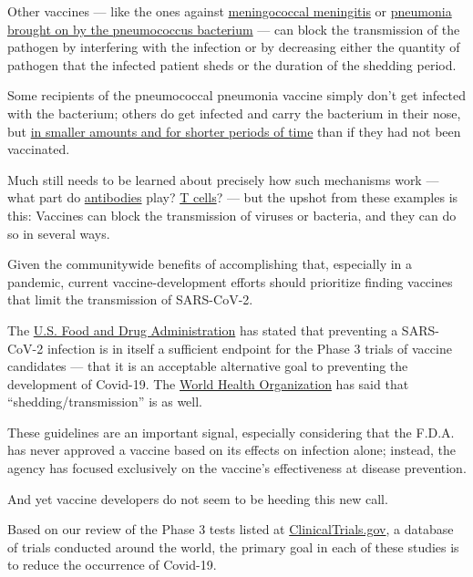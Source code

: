 Other vaccines --- like the ones against
\href{https://academic.oup.com/cid/advance-article-abstract/doi/10.1093/cid/ciaa610/5843568?redirectedFrom=fulltext}{meningococcal
meningitis} or
\href{https://www.ncbi.nlm.nih.gov/pmc/articles/PMC6611220/pdf/main.pdf}{pneumonia
brought on by the pneumococcus bacterium} --- can block the transmission
of the pathogen by interfering with the infection or by decreasing
either the quantity of pathogen that the infected patient sheds or the
duration of the shedding period.

Some recipients of the pneumococcal pneumonia vaccine simply don't get
infected with the bacterium; others do get infected and carry the
bacterium in their nose, but
\href{https://www.atsjournals.org/doi/full/10.1164/rccm.201503-0542OC}{in
smaller amounts and for shorter periods of time} than if they had not
been vaccinated.

Much still needs to be learned about precisely how such mechanisms work
--- what part do
\href{https://www.britannica.com/science/antibody}{antibodies} play?
\href{https://www.britannica.com/science/T-cell}{T cells}? --- but the
upshot from these examples is this: Vaccines can block the transmission
of viruses or bacteria, and they can do so in several ways.

Given the communitywide benefits of accomplishing that, especially in a
pandemic, current vaccine-development efforts should prioritize finding
vaccines that limit the transmission of SARS-CoV-2.

The \href{https://www.fda.gov/media/139638/download}{U.S. Food and Drug
Administration} has stated that preventing a SARS-CoV-2 infection is in
itself a sufficient endpoint for the Phase 3 trials of vaccine
candidates --- that it is an acceptable alternative goal to preventing
the development of Covid-19. The
\href{https://www.who.int/docs/default-source/blue-print/who-target-product-profiles-for-covid-19-vaccines.pdf?sfvrsn=1d5da7ca_5\&download=true}{World
Health Organization} has said that ``shedding/transmission'' is as well.

These guidelines are an important signal, especially considering that
the F.D.A. has never approved a vaccine based on its effects on
infection alone; instead, the agency has focused exclusively on the
vaccine's effectiveness at disease prevention.

And yet vaccine developers do not seem to be heeding this new call.

Based on our review of the Phase 3 tests listed at
\href{https://clinicaltrials.gov/ct2/results?term=vaccine\%2C+phase+3\%2C+efficacy\&recrs=ab\&type=Intr\&cond=covid-19\&fund=2}{ClinicalTrials.gov},
a database of trials conducted around the world, the primary goal in
each of these studies is to reduce the occurrence of Covid-19.

